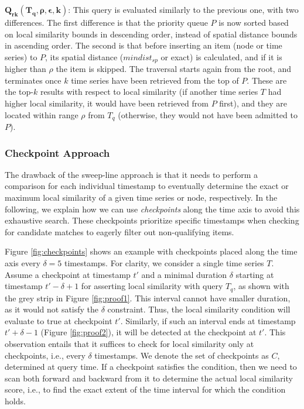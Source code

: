 \noindent $\mathbold{Q_{rk}(T_q, \rho, \epsilon, k)}$: This query is evaluated similarly to the previous one, with two differences. The first difference is that the priority queue $P$ is now sorted based on local similarity bounds in descending order, instead of spatial distance bounds in ascending order. The second is that before inserting an item (node or time series) to $P$, its spatial distance ($mindist_{sp}$ or exact) is calculated, and if it is higher than $\rho$ the item is skipped. The traversal starts again from the root, and terminates once $k$ time series have been retrieved from the top of $P$. These are the top-$k$ results with respect to local similarity (if another time series $T$ had higher local similarity, it would have been retrieved from $P$ first), and they are located within range $\rho$ from $T_q$ (otherwise, they would not have been admitted to $P$). 

\subsubsection{Checkpoint Approach}
\label{sec:checkpoint_search}

The drawback of the sweep-line approach is that it needs to perform a comparison for each individual timestamp to eventually determine the exact or maximum local similarity of a given time series or node, respectively. In the following, we explain how we can use \textit{checkpoints} along the time axis to avoid this exhaustive search. These checkpoints prioritize specific timestamps when checking for candidate matches to eagerly filter out non-qualifying items.

Figure \ref{fig:checkpoints} shows an example with checkpoints placed along the time axis every $\delta=5$ timestamps. For clarity, we consider a single time series $T$. Assume a checkpoint at timestamp $t'$ and a minimal duration $\delta$ starting at timestamp $t'-\delta+1$ for asserting local similarity with query $T_q$, as shown with the grey strip in Figure \ref{fig:proof1}. This interval cannot have smaller duration, as it would not satisfy the $\delta$ constraint. Thus, the local similarity condition will evaluate to true at checkpoint $t'$. Similarly, if such an interval ends at timestamp $t'+\delta-1$ (Figure \ref{fig:proof2}), it will be detected at the checkpoint at $t'$. This observation entails that it suffices to check for local similarity only at checkpoints, i.e., every $\delta$ timestamps. We denote the set of checkpoints as $C$, determined at query time. If a checkpoint satisfies the condition, then we need to scan both forward and backward from it to determine the actual local similarity score, i.e., to find the exact extent of the time interval for which the condition holds.


